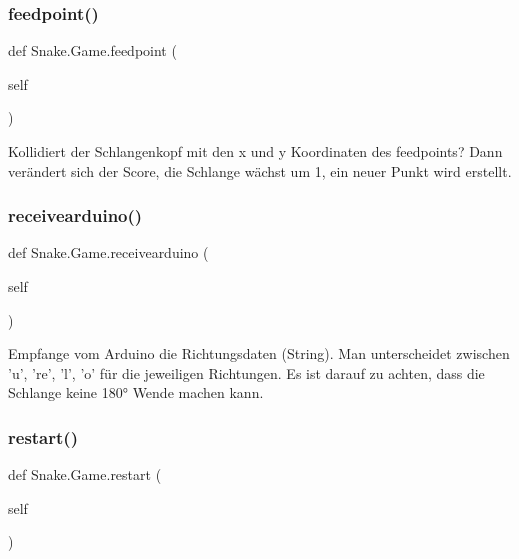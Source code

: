 \subsubsection{\texorpdfstring{feedpoint()}{feedpoint()}}
{\footnotesize\ttfamily def Snake.\+Game.\+feedpoint (\begin{DoxyParamCaption}\item[{}]{self }\end{DoxyParamCaption})}

\begin{DoxyVerb}Kollidiert der Schlangenkopf mit den x und y Koordinaten des feedpoints?
Dann verändert sich der Score, die Schlange wächst um 1, ein neuer Punkt wird erstellt.
\end{DoxyVerb}
 \mbox{\label{class_snake_1_1_game_aebc0cbe1082bdba9f171f075ad8f6693}} 
\subsubsection{\texorpdfstring{receivearduino()}{receivearduino()}}
{\footnotesize\ttfamily def Snake.\+Game.\+receivearduino (\begin{DoxyParamCaption}\item[{}]{self }\end{DoxyParamCaption})}

\begin{DoxyVerb}Empfange vom Arduino die Richtungsdaten (String). Man unterscheidet zwischen
'u', 're', 'l', 'o' für die jeweiligen Richtungen. Es ist darauf zu achten,
dass die Schlange keine 180° Wende machen kann.
\end{DoxyVerb}
 \mbox{\label{class_snake_1_1_game_a5cdcfd6cdea9949bfe5005cb602c68d4}} 
\subsubsection{\texorpdfstring{restart()}{restart()}}
{\footnotesize\ttfamily def Snake.\+Game.\+restart (\begin{DoxyParamCaption}\item[{}]{self }\end{DoxyParamCaption})}

